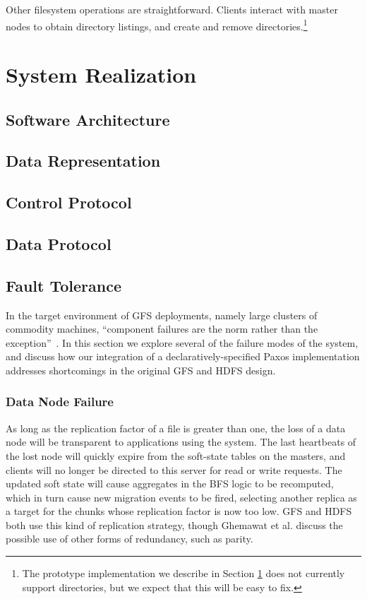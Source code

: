 \documentclass{article}
\begin{document}
Other filesystem operations are straightforward. Clients interact with
master nodes to obtain directory listings, and create and remove
directories.\footnote{The prototype implementation we describe in
  Section \ref{system-realize} does not currently support directories,
  but we expect that this will be easy to fix.}

\section{System Realization}
\label{system-realize}

\subsection{Software Architecture}

\subsection{Data Representation}

\subsection{Control Protocol}

\subsection{Data Protocol}

\subsection{Fault Tolerance}
In the target environment of GFS deployments, namely large clusters of
commodity machines, ``component failures are the norm rather than the
exception''~\cite{gfs}.  In this section we explore several of the
failure modes of the system, and discuss how our integration of a
declaratively-specified Paxos implementation addresses shortcomings in
the original GFS and HDFS design.

\subsubsection{Data Node Failure}
As long as the replication factor of a file is greater than one, the
loss of a data node will be transparent to applications using the
system.  The last heartbeats of the lost node will quickly expire from
the soft-state tables on the masters, and clients will no longer be
directed to this server for read or write requests.  The updated soft
state will cause aggregates in the BFS logic to be recomputed, which
in turn cause new migration events to be fired, selecting another
replica as a target for the chunks whose replication factor is now too
low.  GFS and HDFS both use this kind of replication strategy, though
Ghemawat et al. discuss the possible use of other forms of redundancy,
such as parity.
\end{document}
